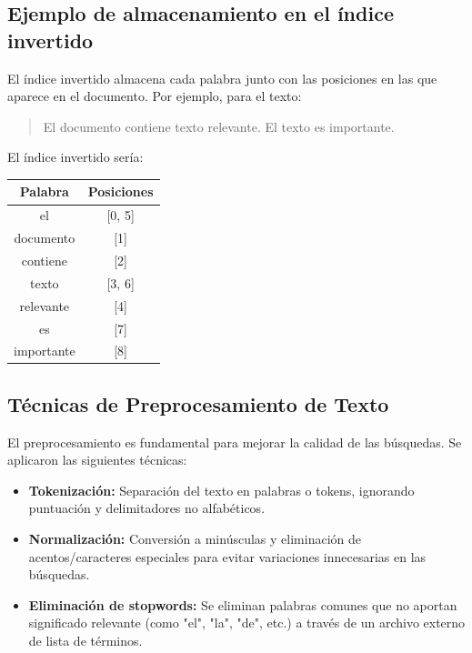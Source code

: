 \documentclass[9pt,letterpaper,onecolumn]{rho-class/rho}
\begin{document}
\subsection{Ejemplo de almacenamiento en el índice invertido}

El índice invertido almacena cada palabra junto con las posiciones en las que aparece en el documento. Por ejemplo, para el texto:

\begin{quote}
El documento contiene texto relevante. El texto es importante.
\end{quote}

El índice invertido sería:

\begin{center}
\begin{tabular}{|c|c|}
\hline
\textbf{Palabra} & \textbf{Posiciones} \\
\hline
el & [0, 5] \\
documento & [1] \\
contiene & [2] \\
texto & [3, 6] \\
relevante & [4] \\
es & [7] \\
importante & [8] \\
\hline
\end{tabular}
\end{center}

\subsection{Técnicas de Preprocesamiento de Texto}

El preprocesamiento es fundamental para mejorar la calidad de las búsquedas. Se aplicaron las siguientes técnicas:

\begin{itemize}
    \item \textbf{Tokenización:}  
    Separación del texto en palabras o tokens, ignorando puntuación y delimitadores no alfabéticos.

    \item \textbf{Normalización:}  
    Conversión a minúsculas y eliminación de acentos/caracteres especiales para evitar variaciones innecesarias en las búsquedas.

    \item \textbf{Eliminación de stopwords:}  
    Se eliminan palabras comunes que no aportan significado relevante (como "el", "la", "de", etc.) a través de un archivo externo de lista de términos.
\end{itemize}
\end{document}

